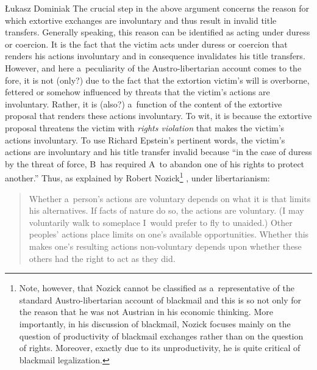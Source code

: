 \begin{artengenv}{Łukasz Dominiak}
The crucial step in the above argument concerns the reason for which extortive exchanges are involuntary and thus result in invalid title transfers. Generally speaking, this reason can be identified as acting under duress or coercion. It is the fact that the victim acts under duress or coercion that renders his actions involuntary and in consequence invalidates his title transfers. However, and here a~peculiarity of the Austro-libertarian account comes to the fore, it is not (only?) due to the fact that the extortion victim's will is overborne, fettered or somehow influenced by threats that the victim's actions are involuntary. Rather, it is (also?) a~function of the content of the extortive proposal that renders these actions involuntary. To wit, it is because the extortive proposal threatens the victim with \textit{rights violation} that makes the victim's actions involuntary. To use Richard Epstein's 
\parencite*[][p.296]{epstein_unconscionability_1975} %
 pertinent words, the victim's actions are involuntary and his title transfer invalid because ``in the case of duress by the threat of force, B~has required A~to abandon one of his rights to protect another.'' Thus, as explained by Robert Nozick\footnote{Note, however, that Nozick cannot be classified as a~representative of the standard Austro-libertarian account of blackmail and this is so not only for the reason that he was not Austrian in his economic thinking. More importantly, in his discussion of blackmail, Nozick focuses mainly on the question of productivity of blackmail exchanges rather than on the question of rights. Moreover, exactly due to its unproductivity, he is quite critical of blackmail legalization.} 
\parencite*[][p.262]{nozick_anarchy_1974}, %
 under libertarianism:



\begin{quote}
Whether a~person's actions are voluntary depends on what it is that limits his alternatives. If facts of nature do so, the actions are voluntary. (I may voluntarily walk to someplace I~would prefer to fly to unaided.) Other peoples' actions place limits on one's available opportunities. Whether this makes one's resulting actions non-voluntary depends upon whether these others had the right to act as they did.
\end{quote}




\end{artengenv}

